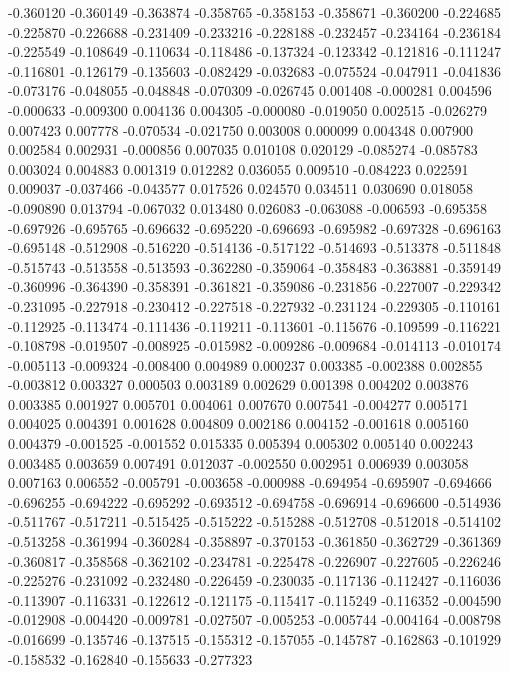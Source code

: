 -0.360120
-0.360149
-0.363874
-0.358765
-0.358153
-0.358671
-0.360200
-0.224685
-0.225870
-0.226688
-0.231409
-0.233216
-0.228188
-0.232457
-0.234164
-0.236184
-0.225549
-0.108649
-0.110634
-0.118486
-0.137324
-0.123342
-0.121816
-0.111247
-0.116801
-0.126179
-0.135603
-0.082429
-0.032683
-0.075524
-0.047911
-0.041836
-0.073176
-0.048055
-0.048848
-0.070309
-0.026745
0.001408
-0.000281
0.004596
-0.000633
-0.009300
0.004136
0.004305
-0.000080
-0.019050
0.002515
-0.026279
0.007423
0.007778
-0.070534
-0.021750
0.003008
0.000099
0.004348
0.007900
0.002584
0.002931
-0.000856
0.007035
0.010108
0.020129
-0.085274
-0.085783
0.003024
0.004883
0.001319
0.012282
0.036055
0.009510
-0.084223
0.022591
0.009037
-0.037466
-0.043577
0.017526
0.024570
0.034511
0.030690
0.018058
-0.090890
0.013794
-0.067032
0.013480
0.026083
-0.063088
-0.006593
-0.695358
-0.697926
-0.695765
-0.696632
-0.695220
-0.696693
-0.695982
-0.697328
-0.696163
-0.695148
-0.512908
-0.516220
-0.514136
-0.517122
-0.514693
-0.513378
-0.511848
-0.515743
-0.513558
-0.513593
-0.362280
-0.359064
-0.358483
-0.363881
-0.359149
-0.360996
-0.364390
-0.358391
-0.361821
-0.359086
-0.231856
-0.227007
-0.229342
-0.231095
-0.227918
-0.230412
-0.227518
-0.227932
-0.231124
-0.229305
-0.110161
-0.112925
-0.113474
-0.111436
-0.119211
-0.113601
-0.115676
-0.109599
-0.116221
-0.108798
-0.019507
-0.008925
-0.015982
-0.009286
-0.009684
-0.014113
-0.010174
-0.005113
-0.009324
-0.008400
0.004989
0.000237
0.003385
-0.002388
0.002855
-0.003812
0.003327
0.000503
0.003189
0.002629
0.001398
0.004202
0.003876
0.003385
0.001927
0.005701
0.004061
0.007670
0.007541
-0.004277
0.005171
0.004025
0.004391
0.001628
0.004809
0.002186
0.004152
-0.001618
0.005160
0.004379
-0.001525
-0.001552
0.015335
0.005394
0.005302
0.005140
0.002243
0.003485
0.003659
0.007491
0.012037
-0.002550
0.002951
0.006939
0.003058
0.007163
0.006552
-0.005791
-0.003658
-0.000988
-0.694954
-0.695907
-0.694666
-0.696255
-0.694222
-0.695292
-0.693512
-0.694758
-0.696914
-0.696600
-0.514936
-0.511767
-0.517211
-0.515425
-0.515222
-0.515288
-0.512708
-0.512018
-0.514102
-0.513258
-0.361994
-0.360284
-0.358897
-0.370153
-0.361850
-0.362729
-0.361369
-0.360817
-0.358568
-0.362102
-0.234781
-0.225478
-0.226907
-0.227605
-0.226246
-0.225276
-0.231092
-0.232480
-0.226459
-0.230035
-0.117136
-0.112427
-0.116036
-0.113907
-0.116331
-0.122612
-0.121175
-0.115417
-0.115249
-0.116352
-0.004590
-0.012908
-0.004420
-0.009781
-0.027507
-0.005253
-0.005744
-0.004164
-0.008798
-0.016699
-0.135746
-0.137515
-0.155312
-0.157055
-0.145787
-0.162863
-0.101929
-0.158532
-0.162840
-0.155633
-0.277323

